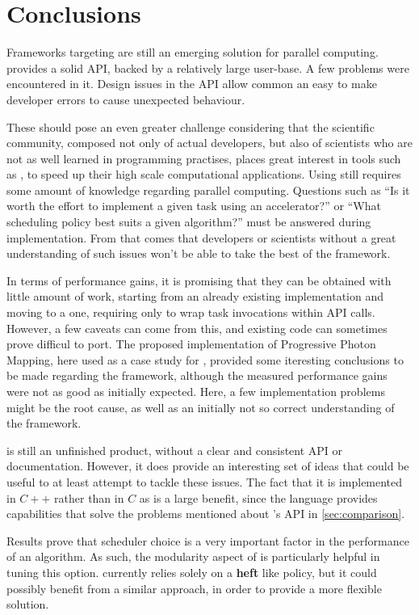 \documentclass[main.tex]{subfiles}
\begin{document}
\chapter{Conclusions} \label{chapter:conclusions}

Frameworks targeting \hetplats are still an emerging solution for parallel computing. \starpu provides a solid API, backed by a relatively large user-base. A few problems were encountered in it. Design issues in the API allow common an easy to make developer errors to cause unexpected behaviour.

These should pose an even greater challenge considering that the scientific community, composed not only of actual developers, but also of scientists who are not as well learned in programming practises, places great interest in tools such as \starpu, to speed up their high scale computational applications. Using \starpu still requires some amount of knowledge regarding parallel computing. Questions such as ``Is it worth the effort to implement a given task using an accelerator?'' or ``What scheduling policy best suits a given algorithm?'' must be answered during implementation. From that comes that developers or scientists without a great understanding of such issues won't be able to take the best of the framework.

In terms of performance gains, it is promising that they can be obtained with little amount of work, starting from an already existing implementation and moving to a \starpu one, requiring only to wrap task invocations within \starpu API calls. However, a few caveats can come from this, and existing code can sometimes prove difficul to port.
The proposed implementation of Progressive Photon Mapping, here used as a case study for \starpu, provided some iteresting conclusions to be made regarding the framework, although the measured performance gains were not as good as initially expected. Here, a few implementation problems might be the root cause, as well as an initially not so correct understanding of the framework.


\gama is still an unfinished product, without a clear and consistent API or documentation. However, it does provide an interesting set of ideas that could be useful to at least attempt to tackle these issues. The fact that it is implemented in $C++$ rather than in $C$ as \starpu is a large benefit, since the language provides capabilities that solve the problems mentioned about \starpu's API in \cref{sec:comparison}.

Results prove that scheduler choice is a very important factor in the performance of an algorithm. As such, the modularity aspect of \starpu is particularly helpful in tuning this option. \gama currently relies solely on a \textbf{heft} like policy, but it could possibly benefit from a similar approach, in order to provide a more flexible solution.
\end{document}
